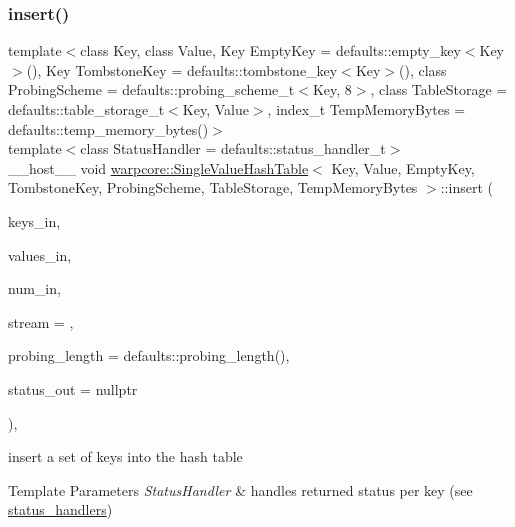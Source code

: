 \subsubsection{\texorpdfstring{insert()}{insert()}\hspace{0.1cm}{\footnotesize\ttfamily [2/2]}}
{\footnotesize\ttfamily template$<$class Key, class Value, Key Empty\+Key = defaults\+::empty\+\_\+key$<$\+Key$>$(), Key Tombstone\+Key = defaults\+::tombstone\+\_\+key$<$\+Key$>$(), class Probing\+Scheme = defaults\+::probing\+\_\+scheme\+\_\+t$<$\+Key, 8$>$, class Table\+Storage = defaults\+::table\+\_\+storage\+\_\+t$<$\+Key, Value$>$, index\+\_\+t Temp\+Memory\+Bytes = defaults\+::temp\+\_\+memory\+\_\+bytes()$>$ \\
template$<$class Status\+Handler  = defaults\+::status\+\_\+handler\+\_\+t$>$ \\
\+\_\+\+\_\+host\+\_\+\+\_\+ void \hyperlink{classwarpcore_1_1SingleValueHashTable}{warpcore\+::\+Single\+Value\+Hash\+Table}$<$ Key, Value, Empty\+Key, Tombstone\+Key, Probing\+Scheme, Table\+Storage, Temp\+Memory\+Bytes $>$\+::insert (\begin{DoxyParamCaption}\item[{const key\+\_\+type $\ast$const}]{keys\+\_\+in,  }\item[{const value\+\_\+type $\ast$const}]{values\+\_\+in,  }\item[{const index\+\_\+type}]{num\+\_\+in,  }\item[{const cuda\+Stream\+\_\+t}]{stream = {},  }\item[{const index\+\_\+type}]{probing\+\_\+length = {\ttfamily defaults\+:\+:probing\+\_\+length()},  }\item[{typename Status\+Handler\+::base\+\_\+type $\ast$const}]{status\+\_\+out = {\ttfamily nullptr} }\end{DoxyParamCaption})\hspace{0.3cm}{\ttfamily [inline]}, {\ttfamily [noexcept]}}



insert a set of keys into the hash table 


\begin{DoxyTemplParams}{Template Parameters}
{\em Status\+Handler} & handles returned status per key (see {\ttfamily \hyperlink{namespacewarpcore_1_1status__handlers}{status\+\_\+handlers}}) \\
\hline
\end{DoxyTemplParams}


